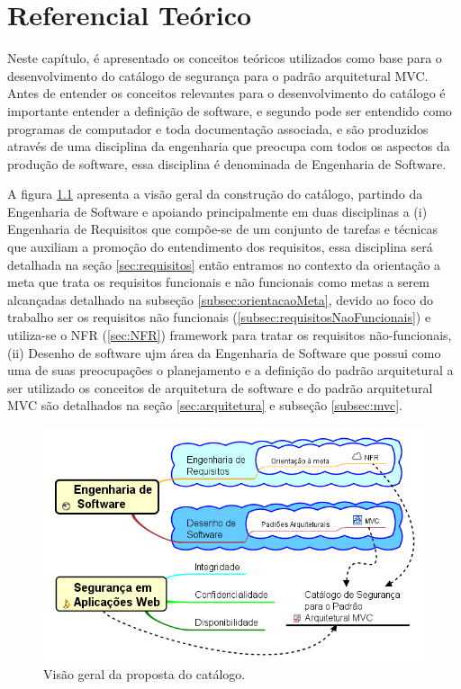 \chapter[Referencial Teórico]{Referencial Teórico}
\label{chap:referencialTeorico}

Neste capítulo, é apresentado os conceitos teóricos utilizados como base para o desenvolvimento do catálogo de segurança para o padrão arquitetural MVC. Antes de entender os conceitos relevantes para o desenvolvimento do catálogo é importante entender a definição de software, e segundo \cite{sommerville2003engenharia} pode ser entendido como programas de computador e toda documentação associada, e são produzidos através de uma disciplina da engenharia que preocupa com todos os aspectos da produção de software, essa disciplina é denominada de Engenharia de Software.

A figura \ref{BigPicture} apresenta a visão geral da construção do catálogo, partindo da Engenharia de Software e apoiando principalmente em duas disciplinas a  (i) Engenharia de Requisitos que compõe-se de um conjunto de tarefas e técnicas que auxiliam a promoção do entendimento dos requisitos, essa disciplina será detalhada na seção \ref{sec:requisitos} então entramos no contexto da orientação a meta que trata os requisitos funcionais e não funcionais como metas a serem alcançadas detalhado na subseção \ref{subsec:orientacaoMeta}, devido ao foco do trabalho ser os requisitos não funcionais (\ref{subsec:requisitosNaoFuncionais}) e utiliza-se o NFR (\ref{sec:NFR}) framework para tratar os requisitos não-funcionais, (ii) Desenho de software ujm área da Engenharia de Software que possui como uma de suas preocupações o planejamento e a definição do padrão arquitetural a ser utilizado
os conceitos de arquitetura de software e do padrão arquitetural MVC são detalhados na seção \ref{sec:arquitetura} e subseção \ref{subsec:mvc}.

\begin{figure}[h]
	\centering
	\includegraphics[keepaspectratio=true,scale=0.8]{figuras/bigPicture.png}
	\caption{Visão geral da proposta do catálogo.}
	\label{BigPicture}
\end{figure}


